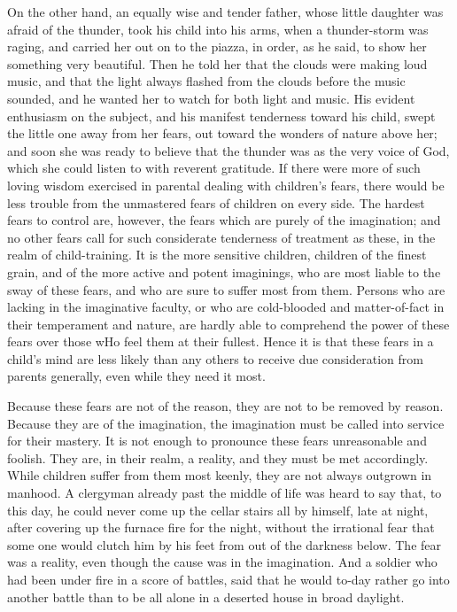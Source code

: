 \documentclass[
]{book}
\begin{document}
On the other hand, an equally wise and tender father, whose little daughter was afraid of the thunder, took his child into his arms, when a thunder-storm was raging, and carried her out on to the piazza, in order, as he said, to show her something very beautiful. Then he told her that the clouds were making loud music, and that the light always flashed from the clouds before the music sounded, and he wanted her to watch for both light and music. His evident enthusiasm on the subject, and his manifest tenderness toward his child, swept the little one away from her fears, out toward the wonders of nature above her; and soon she was ready to believe that the thunder was as the very voice of God, which she could listen to with reverent gratitude. If there were more of such loving wisdom exercised in parental dealing with children's fears, there would be less trouble from the unmastered fears of children on every side. The hardest fears to control are, however, the fears which are purely of the imagination; and no other fears call for such considerate tenderness of treatment as these, in the realm of child-training. It is the more sensitive children, children of the finest grain, and of the more active and potent imaginings, who are most liable to the sway of these fears, and who are sure to suffer most from them. Persons who are lacking in the imaginative faculty, or who are cold-blooded and matter-of-fact in their temperament and nature, are hardly able to comprehend the power of these fears over those wHo feel them at their fullest. Hence it is that these fears in a child's mind are less likely than any others to receive due consideration from parents generally, even while they need it most.

Because these fears are not of the reason, they are not to be removed by reason. Because they are of the imagination, the imagination must be called into service for their mastery. It is not enough to pronounce these fears unreasonable and foolish. They are, in their realm, a reality, and they must be met accordingly. While children suffer from them most keenly, they are not always outgrown in manhood. A clergyman already past the middle of life was heard to say that, to this day, he could never come up the cellar stairs all by himself, late at night, after covering up the furnace fire for the night, without the irrational fear that some one would clutch him by his feet from out of the darkness below. The fear was a reality, even though the cause was in the imagination. And a soldier who had been under fire in a score of battles, said that he would to-day rather go into another battle than to be all alone in a deserted house in broad daylight.
\end{document}

